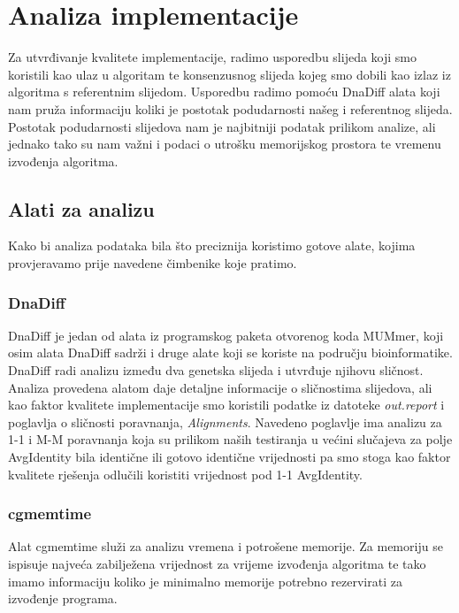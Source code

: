 \documentclass[times, utf8, seminar, numeric]{fer}
\begin{document}

\chapter{Analiza implementacije}
Za utvrđivanje kvalitete implementacije, radimo usporedbu slijeda koji smo koristili kao ulaz u algoritam te konsenzusnog slijeda kojeg smo dobili kao izlaz iz algoritma s referentnim slijedom. Usporedbu radimo pomoću DnaDiff \cite{MUMMER} alata koji nam pruža informaciju koliki je postotak podudarnosti našeg i referentnog slijeda. Postotak podudarnosti slijedova nam je najbitniji podatak prilikom analize, ali jednako tako su nam važni i podaci o utrošku memorijskog prostora te vremenu izvođenja algoritma.

\section{Alati za analizu}
Kako bi analiza podataka bila što preciznija koristimo gotove alate, kojima provjeravamo prije navedene čimbenike koje pratimo.

\subsection{DnaDiff}
DnaDiff \cite{MUMMER} je jedan od alata iz programskog paketa otvorenog koda MUMmer, koji osim alata DnaDiff sadrži i druge alate koji se koriste na području bioinformatike. DnaDiff radi analizu između dva genetska slijeda i utvrđuje njihovu sličnost. Analiza provedena alatom daje detaljne informacije o sličnostima slijedova, ali kao faktor kvalitete implementacije smo koristili podatke iz datoteke \emph{out.report} i poglavlja o sličnosti poravnanja, \emph{Alignments}. Navedeno poglavlje ima analizu za 1-1 i M-M poravnanja koja su prilikom naših testiranja u većini slučajeva za polje AvgIdentity bila identične ili gotovo identične vrijednosti pa smo stoga kao faktor kvalitete rješenja odlučili koristiti vrijednost pod 1-1 AvgIdentity.

\subsection{cgmemtime}
Alat cgmemtime \cite{cgmemtime} služi za analizu vremena i potrošene memorije. Za memoriju se ispisuje najveća zabilježena vrijednost za vrijeme izvođenja algoritma te tako imamo informaciju koliko je minimalno memorije potrebno rezervirati za izvođenje programa.
\end{document}
